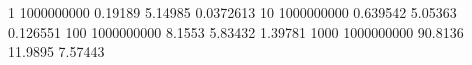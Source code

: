 1 1000000000 0.19189 5.14985 0.0372613
10 1000000000 0.639542 5.05363 0.126551
100 1000000000 8.1553 5.83432 1.39781
1000 1000000000 90.8136 11.9895 7.57443
